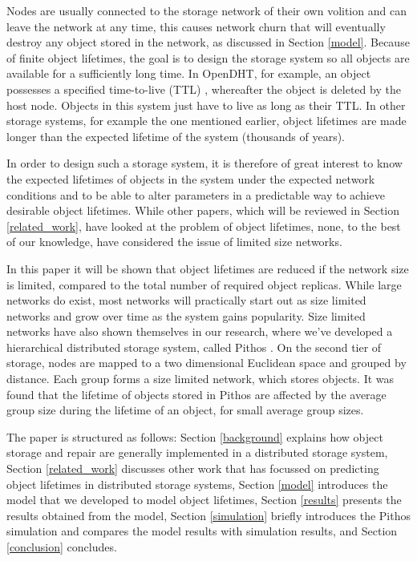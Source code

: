 \documentclass[10pt,a4paper,conference]{IEEEtran}
\begin{document}
Nodes are usually connected to the storage network of their own volition and can leave the network at any time, this causes network churn that will eventually destroy any object stored in the network, as discussed in Section \ref{model}. Because of finite object lifetimes, the goal is to design the storage system so all objects are available for a sufficiently long time. In OpenDHT, for example, an object possesses a specified time-to-live (TTL) \cite{open_dht}, whereafter the object is deleted by the host node. Objects in this system just have to live as long as their TTL. In other storage systems, for example the one mentioned earlier, object lifetimes are made longer than the expected lifetime of the system (thousands of years).

In order to design such a storage system, it is therefore of great interest to know the expected lifetimes of objects in the system under the expected network conditions and to be able to alter parameters in a predictable way to achieve desirable object lifetimes. While other papers, which will be reviewed in Section \ref{related_work}, have looked at the problem of object lifetimes, none, to the best of our knowledge, have considered the issue of limited size networks.

In this paper it will be shown that object lifetimes are reduced if the network size is limited, compared to the total number of required object replicas. While large networks do exist, most networks will practically start out as size limited networks and grow over time as the system gains popularity. Size limited networks have also shown themselves in our research, where we've developed a hierarchical distributed storage system, called Pithos \cite{Pithos_mmve_2011}. On the second tier of storage, nodes are mapped to a two dimensional Euclidean space and grouped by distance. Each group forms a size limited network, which stores objects. It was found that the lifetime of objects stored in Pithos are affected by the average group size during the lifetime of an object, for small average group sizes.

The paper is structured as follows: Section \ref{background} explains how object storage and repair are generally implemented in a distributed storage system,
%
Section \ref{related_work} discusses other work that has focussed on predicting object lifetimes in distributed storage systems,
%
Section \ref{model} introduces the model that we developed to model object lifetimes,
%
Section \ref{results} presents the results obtained from the model,
%
Section \ref{simulation} briefly introduces the Pithos simulation and compares the model results with simulation results, and
%
Section \ref{conclusion} concludes.
\end{document}
